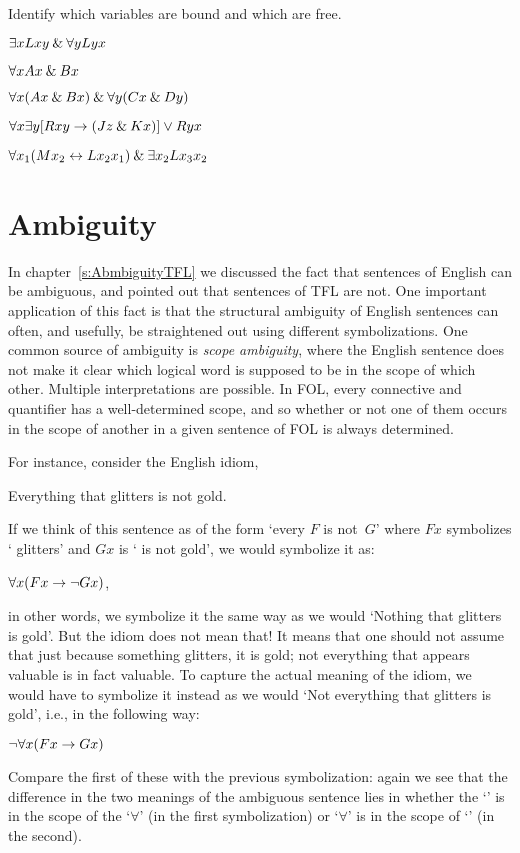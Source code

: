 \practiceproblems
\problempart
\label{pr.freeFOL}
Identify which variables are bound and which are free.
\begin{earg}
\item $\exists x Lxy \mathbin{\&} \forall y Lyx$
\item $\forall x Ax \mathbin{\&} Bx$
\item $\forall x (Ax \mathbin{\&} Bx) \mathbin{\&} \forall y(Cx \mathbin{\&} Dy)$
\item $\forall x\exists y[Rxy \rightarrow (Jz \mathbin{\&} Kx)] \vee Ryx$
\item $\forall x_1(Mx_2 \leftrightarrow Lx_2x_1) \mathbin{\&} \exists x_2 Lx_3x_2$
\end{earg}



\chapter{Ambiguity}

In chapter~\ref{s:AbmbiguityTFL} we discussed the fact that sentences of English can be ambiguous, and pointed out that sentences of TFL are not. One important application of this fact is that the structural ambiguity of English sentences can often, and usefully, be straightened out using different symbolizations.  One common source of ambiguity is \emph{scope ambiguity}, where the English sentence does not make it clear which logical word is supposed to be in the scope of which other. Multiple interpretations are possible.  In FOL, every connective and quantifier has a well-determined scope, and so whether or not one of them occurs in the scope of another in a given sentence of FOL is always determined.

For instance, consider the English idiom,
\begin{earg}
	\item[\ex{glitters}]
	Everything that glitters is not gold.
\end{earg}
If we think of this sentence as of the form `every $F$ is not~$G$' where $F{x}$ symbolizes ` glitters' and ${G}{x}$ is ` is not gold', we would symbolize it as:
\begin{earg}
	\prem $\forall x(F{x} \rightarrow \neg {G}{x})$,
\end{earg}
in other words, we symbolize it the same way as we would `Nothing that glitters is gold'. But the idiom does not mean that! It means that one should not assume that just because something glitters, it is gold; not everything that appears valuable is in fact valuable.  To capture the actual meaning of the idiom, we would have to symbolize it instead as we would `Not everything that glitters is gold', i.e., in the following way:
\begin{earg}
	\prem $\neg\forall x(F{x} \rightarrow {G}{x})$
\end{earg}
Compare the first of these with the previous symbolization: again we see that the difference in the two meanings of the ambiguous sentence lies in whether the `\enot' is in the scope of the `$\forall$' (in the first symbolization) or `$\forall$' is in the scope of `\enot' (in the second).

